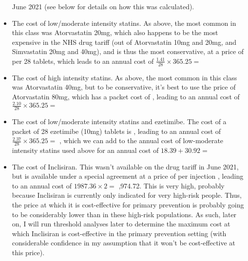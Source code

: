 \documentclass[11pt]{article}
\begin{document}
\begin{itemize}
June 2021 \cite{NHSEPD} (see below for details on how this was calculated).
\item The cost of low/moderate intensity statins. As above, the most common in this class was Atorvastatin 20mg, which also
happens to be the most expensive in the NHS drug tariff (out of Atorvastatin 10mg and 20mg, and Simvastatin 20mg and 40mg),
and is thus the most conservative, at a price of  per 28 tablets, which leads to an annual cost of 
\begin{math} \frac{1.41}{28} \times 365.25 = \end{math} 
\item The cost of high intensity statins. As above, the most common in this class was Atorvastatin 40mg, but
to be conservative, it's best to use the price of Atorvastatin 80mg, which has a packet cost of , leading
to an annual cost of \begin{math} \frac{2.10}{28} \times 365.25 = \end{math} 
\item The cost of low/moderate intensity statins and ezetimibe. The cost of a packet of 28 ezetimibe (10mg) tablets
is , leading to an annual cost of 
\begin{math} \frac{2.37}{28} \times 365.25 = \end{math} , which we can add to the annual cost of
low-moderate intensity statins used above for an annual cost of 
\begin{math} 18.39+30.92 = \end{math} 
\item The cost of Inclisiran. This wasn't available on the drug tariff in June 2021, but is available under a special agreement 
at a price of  per injection \cite{NHSDMDInclisiran2022}, leading to an annual cost of 
\begin{math} 1987.36 \times 2 = \end{math}  ,974.72.
This is very high, probably because Inclisiran is currently
only indicated for very high-risk people. Thus, the price at which it is cost-effective for primary prevention is probably going
to be considerably lower than in these high-risk populations. As such, later on, I will run threshold analyses later to determine
the maximum cost at which Inclisiran is cost-effective in the primary prevention setting (with considerable confidence in my
assumption that it won't be cost-effective at this price). 
\end{itemize}
\end{document}
